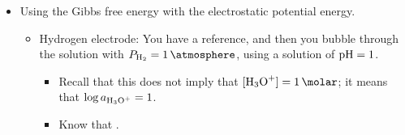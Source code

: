 \documentclass[../notes.tex]{subfiles}
\begin{document}
\begin{itemize}
\begin{itemize}
\begin{itemize}
            \item What we have is  and , so electrons flow through the wire from the zinc anode to the copper cathode.
            \item The overall redox reaction is
            \begin{equation*}
                \ce{Zn_{(s)} + Cu^2+ -> Zn^2+ + Cu_{(s)}}
            \end{equation*}
            \item The relevant molar Gibbs energies of formation ($\Delta\overline{G}_f^\circ$) are zero for the metals, \SI{-147}{\kilo\joule\per\mole} for , and \SI{65}{\kilo\joule\per\mole} for .
            \item Thus, this reaction is spontaneous with $\Delta\overline{G}^\circ=-147-65=\SI{-212}{\kilo\joule\per\mole}$.
        \end{itemize}
        \item We know that $\Delta\overline{G}^\circ=w_{\text{non }PV}=\Delta\overline{Q}\cdot E$ at constant $T,P$, where $E$ is the electrochemical potential.
        \item We also know that $\Delta\overline{Q}=-2eN_A=-2F$ (negative since we're losing electrons) where
        \begin{equation*}
            F = \SI{96485}{\coulomb}
        \end{equation*}
        is the \textbf{Faraday constant}.
        \item Thus,
        \begin{equation*}
            E = \frac{\Delta\overline{G}^\circ}{2F}
            = \frac{-212}{-2F}
            = \frac{-212000}{-2\cdot 96485}
            = \SI{1.1}{\volt}
        \end{equation*}
    \end{itemize}
    \item Using the Gibbs free energy with the electrostatic potential energy.
    \begin{itemize}
        \item Hydrogen electrode: You have a reference, and then you bubble  through the solution with $P_{\ce{H2}}=\SI{1}{\atmosphere}$, using a solution of $\operatorname{pH}=1$.
        \begin{itemize}
            \item Recall that this does not imply that $[\ce{H3O+}]=\SI{1}{\molar}$; it means that $\log a_{\ce{H3O+}}=1$.
            \item Know that .

\end{itemize}
\end{itemize}
\end{itemize}
\end{document}
